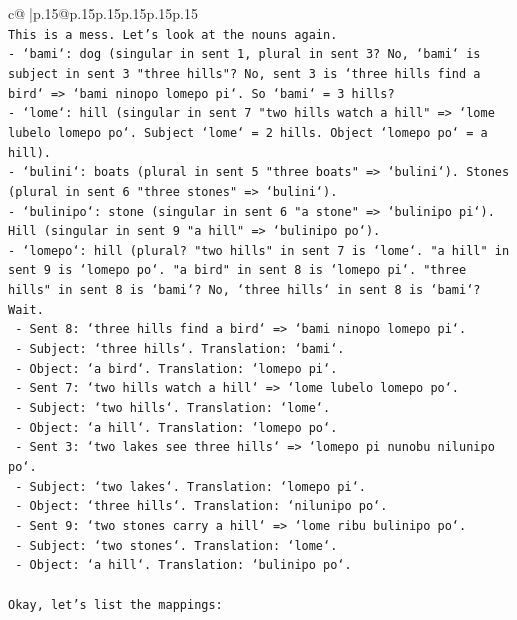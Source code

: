 \documentclass{article}
\begin{document}
{\begin{supertabular}{c@{$\;$}|p{.15\linewidth}@{}p{.15\linewidth}p{.15\linewidth}p{.15\linewidth}p{.15\linewidth}p{.15\linewidth}}
{{{\\ 
\texttt{This is a mess. Let's look at the nouns again.} \\
\texttt{{-} `bami`: dog (singular in sent 1, plural in sent 3? No, `bami` is subject in sent 3 "three hills"? No, sent 3 is `three hills find a bird` => `bami ninopo lomepo pi`. So `bami` = 3 hills?} \\
\texttt{{-} `lome`: hill (singular in sent 7 "two hills watch a hill" => `lome lubelo lomepo po`. Subject `lome` = 2 hills. Object `lomepo po` = a hill).} \\
\texttt{{-} `bulini`: boats (plural in sent 5 "three boats" => `bulini`). Stones (plural in sent 6 "three stones" => `bulini`).} \\
\texttt{{-} `bulinipo`: stone (singular in sent 6 "a stone" => `bulinipo pi`). Hill (singular in sent 9 "a hill" => `bulinipo po`).} \\
\texttt{{-} `lomepo`: hill (plural? "two hills" in sent 7 is `lome`. "a hill" in sent 9 is `lomepo po`. "a bird" in sent 8 is `lomepo pi`. "three hills" in sent 8 is `bami`? No, `three hills` in sent 8 is `bami`? Wait.} \\
\texttt{  {-} Sent 8: `three hills find a bird` => `bami ninopo lomepo pi`.} \\
\texttt{    {-} Subject: `three hills`. Translation: `bami`.} \\
\texttt{    {-} Object: `a bird`. Translation: `lomepo pi`.} \\
\texttt{  {-} Sent 7: `two hills watch a hill` => `lome lubelo lomepo po`.} \\
\texttt{    {-} Subject: `two hills`. Translation: `lome`.} \\
\texttt{    {-} Object: `a hill`. Translation: `lomepo po`.} \\
\texttt{  {-} Sent 3: `two lakes see three hills` => `lomepo pi nunobu nilunipo po`.} \\
\texttt{    {-} Subject: `two lakes`. Translation: `lomepo pi`.} \\
\texttt{    {-} Object: `three hills`. Translation: `nilunipo po`.} \\
\texttt{  {-} Sent 9: `two stones carry a hill` => `lome ribu bulinipo po`.} \\
\texttt{    {-} Subject: `two stones`. Translation: `lome`.} \\
\texttt{    {-} Object: `a hill`. Translation: `bulinipo po`.} \\
\\ 
\texttt{Okay, let's list the mappings:} \\
}}}
\end{supertabular}}
\end{document}
